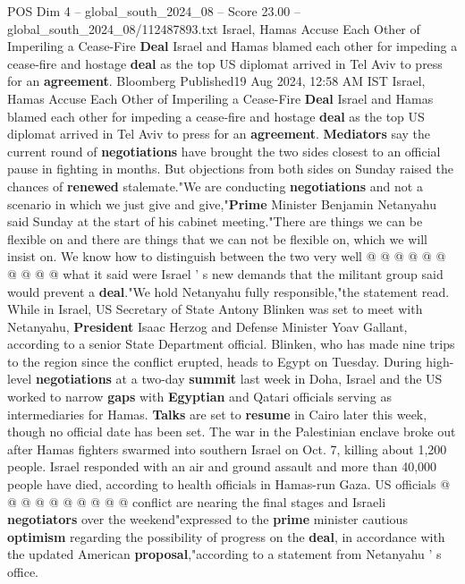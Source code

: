 \begin{textsample}{POS Dim 4 – global\_south\_2024\_08 – Score 23.00 – global\_south\_2024\_08/112487893.txt}  \label{ex:f4_pos_124}
Israel, Hamas Accuse Each Other of Imperiling a Cease-Fire \textbf{Deal} Israel and Hamas blamed each other for impeding a cease-fire and hostage \textbf{deal} as the top US diplomat arrived in Tel Aviv to press for an \textbf{agreement}.
Bloomberg Published19 Aug 2024, 12:58 AM IST Israel, Hamas Accuse Each Other of Imperiling a Cease-Fire \textbf{Deal} Israel and Hamas blamed each other for impeding a cease-fire and hostage \textbf{deal} as the top US diplomat arrived in Tel Aviv to press for an \textbf{agreement}. \textbf{Mediators} say the current round of \textbf{negotiations} have brought the two sides closest to an official pause in fighting in months.
But objections from both sides on Sunday raised the chances of \textbf{renewed} stalemate."We are conducting \textbf{negotiations} and not a scenario in which we just give and give,"\textbf{Prime} Minister Benjamin Netanyahu said Sunday at the start of his cabinet meeting."There are things we can be flexible on and there are things that we can not be flexible on, which we will insist on.
We know how to distinguish between the two very well @ @ @ @ @ @ @ @ @ @ what it said were Israel ' s new demands that the militant group said would prevent a \textbf{deal}."We hold Netanyahu fully responsible,"the statement read.
While in Israel, US Secretary of State Antony Blinken was set to meet with Netanyahu, \textbf{President} Isaac Herzog and Defense Minister Yoav Gallant, according to a senior State Department official.
Blinken, who has made nine trips to the region since the conflict erupted, heads to Egypt on Tuesday.
During high-level \textbf{negotiations} at a two-day \textbf{summit} last week in Doha, Israel and the US worked to narrow \textbf{gaps} with \textbf{Egyptian} and Qatari officials serving as intermediaries for Hamas. \textbf{Talks} are set to \textbf{resume} in Cairo later this week, though no official date has been set.
The war in the Palestinian enclave broke out after Hamas fighters swarmed into southern Israel on Oct. 7, killing about 1,200 people.
Israel responded with an air and ground assault and more than 40,000 people have died, according to health officials in Hamas-run Gaza.
US officials @ @ @ @ @ @ @ @ @ @ conflict are nearing the final stages and Israeli \textbf{negotiators} over the weekend"expressed to the \textbf{prime} minister cautious \textbf{optimism} regarding the possibility of progress on the \textbf{deal}, in accordance with the updated American \textbf{proposal},"according to a statement from Netanyahu ' s office.

\end{textsample}
